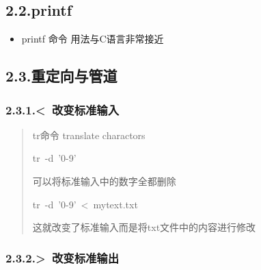 \documentclass{article}
\begin{document}
\subsection{2.2.\hspace*{0.5em}printf}\label{sec-printf}%

\begin{itemize}[noitemsep,topsep=\mdcompacttopsep]%

\item{}printf 命令
用法与C语言非常接近%
\end{itemize}%

\subsection{2.3.\hspace*{0.5em}重定向与管道}\label{section}%

\subsubsection{2.3.1.\hspace*{0.5em}\textless{}~改变标准输入}\label{sec--}%

\begin{quote}%

\noindent{}tr命令\mdbr
{}translate charactors %
\begin{mdpre}%
\noindent{}tr~-d~'0-9'%
\end{mdpre}\noindent{}可以将标准输入中的数字全都删除
\begin{mdpre}%
\noindent{}tr~-d~'0-9'~\textless{}~mytext.txt%
\end{mdpre}\noindent{}这就改变了标准输入而是将txt文件中的内容进行修改
\end{quote}%

\subsubsection{2.3.2.\hspace*{0.5em}\textgreater{}~改变标准输出}\label{sec--}%
\end{document}
